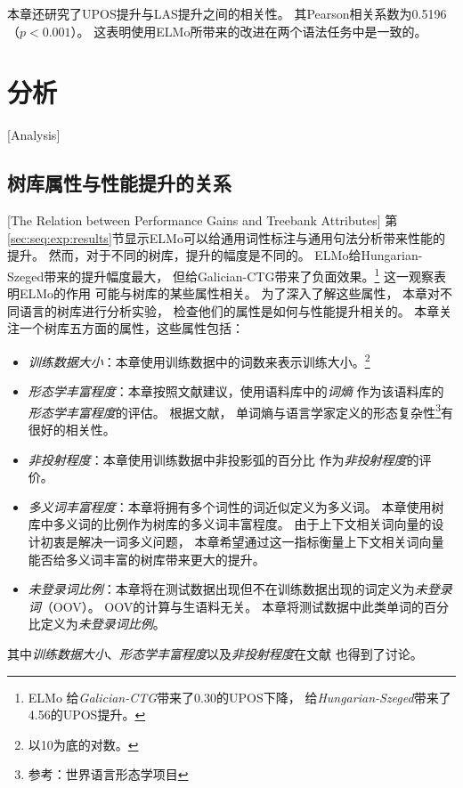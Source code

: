 本章还研究了UPOS提升与LAS提升之间的相关性。
其Pearson相关系数为0.5196（$p<0.001$）。
这表明使用ELMo所带来的改进在两个语法任务中是一致的。

\section{分析}[Analysis]\label{sec:seq:anal}

\subsection{树库属性与性能提升的关系}[The Relation between Performance Gains and Treebank Attributes]
第\ref{sec:seq:exp:results}节显示ELMo可以给通用词性标注与通用句法分析带来性能的提升。
然而，对于不同的树库，提升的幅度是不同的。
ELMo给Hungarian-Szeged带来的提升幅度最大，
但给Galician-CTG带来了负面效果。\footnote{ELMo
	给\textit{Galician-CTG}带来了0.30的UPOS下降，
	给\textit{Hungarian-Szeged}带来了4.56的UPOS提升。}
这一观察表明ELMo的作用
可能与树库的某些属性相关。
为了深入了解这些属性，
本章对不同语言的树库进行分析实验，
检查他们的属性是如何与性能提升相关的。
本章关注一个树库五方面的属性，这些属性包括：
\begin{itemize}
\item \textit{训练数据大小}：本章使用训练数据中的词数来表示训练大小。\footnote {以10为底的对数。}
\item \textit{形态学丰富程度}：本章按照文献建议，使用语料库中的\textit{词熵}
作为该语料库的\textit{形态学丰富程度}的评估。
根据文献，
单词熵与语言学家定义的形态复杂性\footnote{参考：世界语言形态学项目}有很好的相关性。
\item \textit{非投射程度}：本章使用训练数据中非投影弧的百分比
作为\textit{非投射程度}的评价。
\item \textit{多义词丰富程度}：本章将拥有多个词性的词近似定义为多义词。
本章使用树库中多义词的比例作为树库的多义词丰富程度。
由于上下文相关词向量的设计初衷是解决一词多义问题，
本章希望通过这一指标衡量上下文相关词向量能否给多义词丰富的树库带来更大的提升。
\item \textit{未登录词比例}：本章将在测试数据出现但不在训练数据出现的词定义为\textit{未登录词}（OOV）。
OOV的计算与生语料无关。
本章将测试数据中此类单词的百分比定义为\textit{未登录词比例}。
\end{itemize}
其中\textit{训练数据大小}、\textit{形态学丰富程度}以及\textit{非投射程度}在文献
也得到了讨论。

